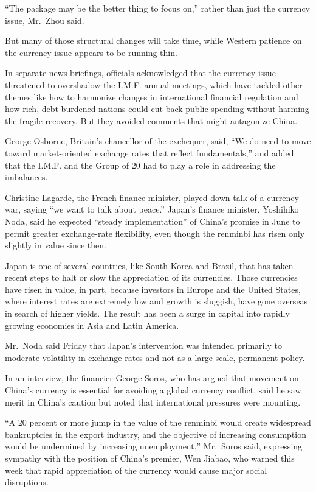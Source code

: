 ﻿\documentclass[12pt]{article}
\begin{document}
``The package may be the better thing to focus on,'' rather than just the currency issue, Mr.~Zhou
said.

But many of those structural changes will take time, while Western patience on the currency issue
appears to be running thin.

In separate news briefings, officials acknowledged that the currency issue threatened to overshadow
the I.M.F. annual meetings, which have tackled other themes like how to harmonize changes in
international financial regulation and how rich, debt-burdened nations could cut back public
spending without harming the fragile recovery. But they avoided comments that might antagonize
China.

George Osborne, Britain's chancellor of the exchequer, said, ``We do need to move toward
market-oriented exchange rates that reflect fundamentals,'' and added that the I.M.F. and the Group
of 20 had to play a role in addressing the imbalances.

Christine Lagarde, the French finance minister, played down talk of a currency war, saying ``we want
to talk about peace.'' Japan's finance minister, Yoshihiko Noda, said he expected ``steady
implementation'' of China's promise in June to permit greater exchange-rate flexibility, even though
the renminbi has risen only slightly in value since then.

Japan is one of several countries, like South Korea and Brazil, that has taken recent steps to halt
or slow the appreciation of its currencies. Those currencies have risen in value, in part, because
investors in Europe and the United States, where interest rates are extremely low and growth is
sluggish, have gone overseas in search of higher yields. The result has been a surge in capital into
rapidly growing economies in Asia and Latin America.

Mr.~Noda said Friday that Japan's intervention was intended primarily to moderate volatility in
exchange rates and not as a large-scale, permanent policy.

In an interview, the financier George Soros, who has argued that movement on China's currency is
essential for avoiding a global currency conflict, said he saw merit in China's caution but noted
that international pressures were mounting.

``A 20 percent or more jump in the value of the renminbi would create widespread bankruptcies in the
export industry, and the objective of increasing consumption would be undermined by increasing
unemployment,'' Mr.~Soros said, expressing sympathy with the position of China's premier, Wen
Jiabao, who warned this week that rapid appreciation of the currency would cause major social
disruptions.
\end{document}
